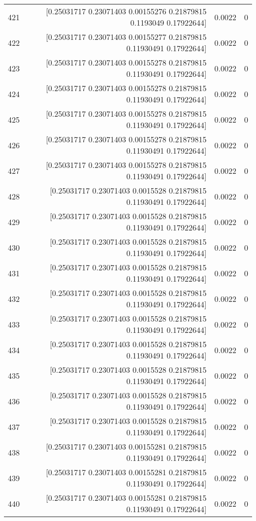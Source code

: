 \begin{longtable}{lrrr}
421 & [0.25031717 0.23071403 0.00155276 0.21879815 0.1193049  0.17922644] & 0.0022 & 0 \\
422 & [0.25031717 0.23071403 0.00155277 0.21879815 0.11930491 0.17922644] & 0.0022 & 0 \\
423 & [0.25031717 0.23071403 0.00155278 0.21879815 0.11930491 0.17922644] & 0.0022 & 0 \\
424 & [0.25031717 0.23071403 0.00155278 0.21879815 0.11930491 0.17922644] & 0.0022 & 0 \\
425 & [0.25031717 0.23071403 0.00155278 0.21879815 0.11930491 0.17922644] & 0.0022 & 0 \\
426 & [0.25031717 0.23071403 0.00155278 0.21879815 0.11930491 0.17922644] & 0.0022 & 0 \\
427 & [0.25031717 0.23071403 0.00155278 0.21879815 0.11930491 0.17922644] & 0.0022 & 0 \\
428 & [0.25031717 0.23071403 0.0015528  0.21879815 0.11930491 0.17922644] & 0.0022 & 0 \\
429 & [0.25031717 0.23071403 0.0015528  0.21879815 0.11930491 0.17922644] & 0.0022 & 0 \\
430 & [0.25031717 0.23071403 0.0015528  0.21879815 0.11930491 0.17922644] & 0.0022 & 0 \\
431 & [0.25031717 0.23071403 0.0015528  0.21879815 0.11930491 0.17922644] & 0.0022 & 0 \\
432 & [0.25031717 0.23071403 0.0015528  0.21879815 0.11930491 0.17922644] & 0.0022 & 0 \\
433 & [0.25031717 0.23071403 0.0015528  0.21879815 0.11930491 0.17922644] & 0.0022 & 0 \\
434 & [0.25031717 0.23071403 0.0015528  0.21879815 0.11930491 0.17922644] & 0.0022 & 0 \\
435 & [0.25031717 0.23071403 0.0015528  0.21879815 0.11930491 0.17922644] & 0.0022 & 0 \\
436 & [0.25031717 0.23071403 0.0015528  0.21879815 0.11930491 0.17922644] & 0.0022 & 0 \\
437 & [0.25031717 0.23071403 0.0015528  0.21879815 0.11930491 0.17922644] & 0.0022 & 0 \\
438 & [0.25031717 0.23071403 0.00155281 0.21879815 0.11930491 0.17922644] & 0.0022 & 0 \\
439 & [0.25031717 0.23071403 0.00155281 0.21879815 0.11930491 0.17922644] & 0.0022 & 0 \\
440 & [0.25031717 0.23071403 0.00155281 0.21879815 0.11930491 0.17922644] & 0.0022 & 0 \\

\end{longtable}
